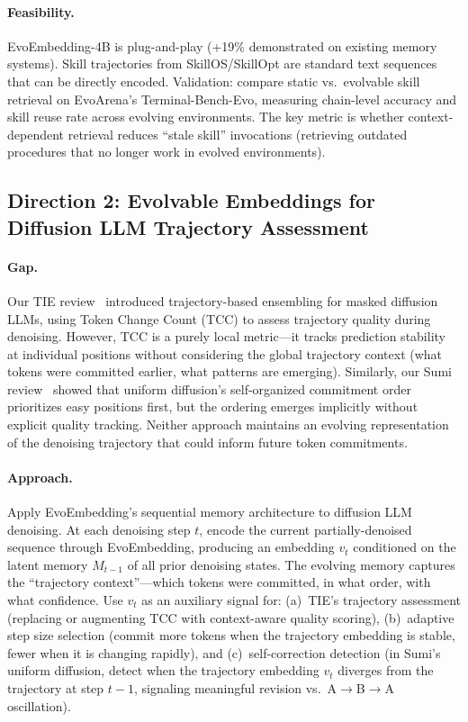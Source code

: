 \documentclass[11pt,a4paper]{article}
\begin{document}
\paragraph{Feasibility.} EvoEmbedding-4B is plug-and-play (+19\% demonstrated on existing memory systems). Skill trajectories from SkillOS/SkillOpt are standard text sequences that can be directly encoded. Validation: compare static vs.\ evolvable skill retrieval on EvoArena's Terminal-Bench-Evo, measuring chain-level accuracy and skill reuse rate across evolving environments. The key metric is whether context-dependent retrieval reduces ``stale skill'' invocations (retrieving outdated procedures that no longer work in evolved environments).

\subsection{Direction 2: Evolvable Embeddings for Diffusion LLM Trajectory Assessment}

\paragraph{Gap.} Our TIE review~\cite{yun2026tie} introduced trajectory-based ensembling for masked diffusion LLMs, using Token Change Count (TCC) to assess trajectory quality during denoising. However, TCC is a purely local metric---it tracks prediction stability at individual positions without considering the global trajectory context (what tokens were committed earlier, what patterns are emerging). Similarly, our Sumi review~\cite{ye2026sumi} showed that uniform diffusion's self-organized commitment order prioritizes easy positions first, but the ordering emerges implicitly without explicit quality tracking. Neither approach maintains an evolving representation of the denoising trajectory that could inform future token commitments.

\paragraph{Approach.} Apply EvoEmbedding's sequential memory architecture to diffusion LLM denoising. At each denoising step $t$, encode the current partially-denoised sequence through EvoEmbedding, producing an embedding $v_t$ conditioned on the latent memory $M_{t-1}$ of all prior denoising states. The evolving memory captures the ``trajectory context''---which tokens were committed, in what order, with what confidence. Use $v_t$ as an auxiliary signal for: (a)~TIE's trajectory assessment (replacing or augmenting TCC with context-aware quality scoring), (b)~adaptive step size selection (commit more tokens when the trajectory embedding is stable, fewer when it is changing rapidly), and (c)~self-correction detection (in Sumi's uniform diffusion, detect when the trajectory embedding $v_t$ diverges from the trajectory at step $t-1$, signaling meaningful revision vs.\ A$\to$B$\to$A oscillation).
\end{document}
